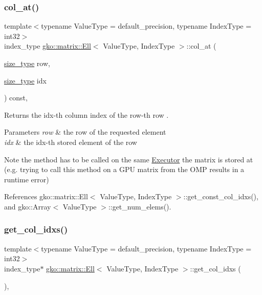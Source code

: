 \subsubsection{\texorpdfstring{col\+\_\+at()}{col\_at()}\hspace{0.1cm}{\footnotesize\ttfamily [2/2]}}
{\footnotesize\ttfamily template$<$typename Value\+Type = default\+\_\+precision, typename Index\+Type = int32$>$ \\
index\+\_\+type \hyperlink{classgko_1_1matrix_1_1Ell}{gko\+::matrix\+::\+Ell}$<$ Value\+Type, Index\+Type $>$\+::col\+\_\+at (\begin{DoxyParamCaption}\item[{\hyperlink{namespacegko_a6e5c95df0ae4e47aab2f604a22d98ee7}{size\+\_\+type}}]{row,  }\item[{\hyperlink{namespacegko_a6e5c95df0ae4e47aab2f604a22d98ee7}{size\+\_\+type}}]{idx }\end{DoxyParamCaption}) const\hspace{0.3cm}{\ttfamily [inline]}, {\ttfamily [noexcept]}}



Returns the {\ttfamily idx}-\/th column index of the {\ttfamily row}-\/th row . 


\begin{DoxyParams}{Parameters}
{\em row} & the row of the requested element \\
\hline
{\em idx} & the idx-\/th stored element of the row\\
\hline
\end{DoxyParams}
\begin{DoxyNote}{Note}
the method has to be called on the same \hyperlink{classgko_1_1Executor}{Executor} the matrix is stored at (e.\+g. trying to call this method on a G\+PU matrix from the O\+MP results in a runtime error) 
\end{DoxyNote}


References gko\+::matrix\+::\+Ell$<$ Value\+Type, Index\+Type $>$\+::get\+\_\+const\+\_\+col\+\_\+idxs(), and gko\+::\+Array$<$ Value\+Type $>$\+::get\+\_\+num\+\_\+elems().

\mbox{\label{classgko_1_1matrix_1_1Ell_ac80ca9482997e97d88425214fd1b8aef}} 
\subsubsection{\texorpdfstring{get\+\_\+col\+\_\+idxs()}{get\_col\_idxs()}}
{\footnotesize\ttfamily template$<$typename Value\+Type = default\+\_\+precision, typename Index\+Type = int32$>$ \\
index\+\_\+type$\ast$ \hyperlink{classgko_1_1matrix_1_1Ell}{gko\+::matrix\+::\+Ell}$<$ Value\+Type, Index\+Type $>$\+::get\+\_\+col\+\_\+idxs (\begin{DoxyParamCaption}{ }\end{DoxyParamCaption})\hspace{0.3cm}{\ttfamily [inline]}, {\ttfamily [noexcept]}}



